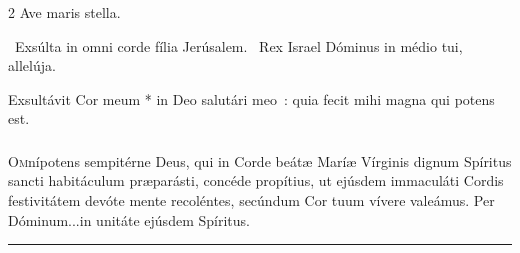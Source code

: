\documentclass[9pt,twoside]{extarticle}
\begin{document}
\begin{multicols}{2}
 Ave maris stella. 

~Exsúlta in omni corde fília Jerúsalem. ~Rex Israel Dóminus in médio tui, allelúja.

\normalsize {} Exsultávit Cor meum * in Deo salutári meo~: quia fecit mihi magna qui potens est.

\subsubsection*{\center \normalfont {}}
\lettrine{O}{m}nípotens sempitérne Deus, qui in Corde beátæ Maríæ Vírginis dignum Spíritus sancti habitáculum præparásti, concéde propítius, ut ejúsdem immaculáti Cordis festivitátem devóte mente recoléntes, secúndum Cor tuum vívere valeámus. Per Dóminum...in unitáte ejúsdem Spíritus.

\smallskip 
\small {}
\medskip
\begin{center}\textcolor{red}{\rule{\linewidth}{0.5pt}} \end{center}

\end{multicols}
\end{document}
